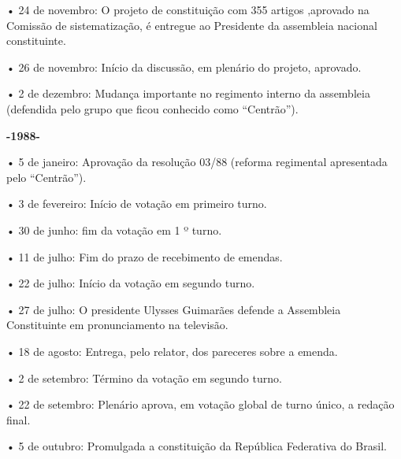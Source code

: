 • 24 de novembro: O projeto de constituição com 355 artigos ,aprovado na
Comissão de sistematização, é entregue ao Presidente da assembleia
nacional constituinte.

• 26 de novembro: Início da discussão, em plenário do projeto, aprovado.

• 2 de dezembro: Mudança importante no regimento interno da assembleia
(defendida pelo grupo que ficou conhecido como ``Centrão'').

\textbf{-1988-}

• 5 de janeiro: Aprovação da resolução 03/88 (reforma regimental
apresentada pelo ``Centrão'').

• 3 de fevereiro: Início de votação em primeiro turno.

• 30 de junho: fim da votação em 1 º turno.

• 11 de julho: Fim do prazo de recebimento de emendas.

• 22 de julho: Início da votação em segundo turno.

• 27 de julho: O presidente Ulysses Guimarães defende a Assembleia
Constituinte em pronunciamento na televisão.

• 18 de agosto: Entrega, pelo relator, dos pareceres sobre a emenda.

• 2 de setembro: Término da votação em segundo turno.

• 22 de setembro: Plenário aprova, em votação global de turno único, a
redação final.

• 5 de outubro: Promulgada a constituição da República Federativa do
Brasil.